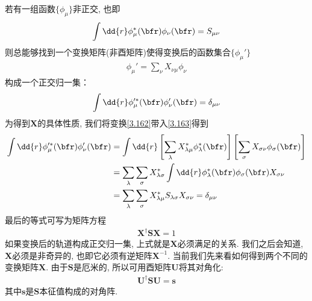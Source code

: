 若有一组函数$\{\phi_\mu\}$非正交, 
也即
\begin{align}
	\int\dd{r}\phi_\mu^*(\bfr)\phi_\nu(\bfr) = S_{\mu\nu}
\end{align}
则总能够找到一个变换矩阵(非酉矩阵)使得变换后的函数集合$\{\phi_\mu'\}$
\begin{align}\label{3.162}
	\phi_\mu' = \sum_{\nu}X_{\nu\mu}\phi_\nu
\end{align}
构成一个正交归一集：
\begin{align}
	\label{3.163}
	\int\dd{r}\phi_\mu^{\prime*}(\bfr)\phi_\nu'(\bfr) = \delta_{\mu\nu}
\end{align}
为得到$\mathbf{X}$的具体性质, 
我们将变换\autoref{3.162}带入\autoref{3.163}得到
\begin{align}
	\int\dd{r}\phi_\mu^{\prime *}(\bfr)\phi_\nu^{\prime}(\bfr) & = \int\dd{r}\left[ \sum_{\lambda}X_{\lambda\mu}^*\phi_{\lambda}^*(\bfr)\right]\left[ \sum_\sigma X_{\sigma\nu}\phi_\sigma(\bfr) \right]\notag\\
	& = \sum_\lambda\sum_\sigma X_{\lambda\sigma}^*\int\dd{r}\phi_\lambda^*(\bfr)\phi_\sigma(\bfr)X_{\sigma\nu}\notag\\
	& = \sum_\lambda\sum_\sigma X_{\lambda\mu}^*S_{\lambda\sigma}X_{\sigma\nu} = \delta_{\mu\nu}
\end{align}
最后的等式可写为矩阵方程
\begin{align}\label{3.165}
	\mathbf{X^\dagger SX}=1
\end{align}
如果变换后的轨道构成正交归一集, 
上式就是$\mathbf{X}$必须满足的关系. 
我们之后会知道, 
$\mathbf{X}$必须是非奇异的, 
也即它必须有逆矩阵$\mathbf{X}^{-1}$. 
当前我们先来看如何得到两个不同的变换矩阵$\mathbf{X}$. 
由于$\mathbf{S}$是厄米的, 
所以可用酉矩阵$\mathbf{U}$将其对角化:
\begin{align}
	\mathbf{U^\dagger SU=s}
\end{align} 
其中$\mathbf{s}$是$\mathbf{S}$本征值构成的对角阵.


